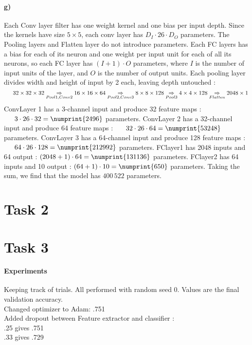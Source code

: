 \documentclass{article}
\begin{document}
		\paragraph{g)}
		Each Conv layer filter has one weight kernel and one bias per input depth. Since the kernels have size $5 \times 5$, each conv layer has $D_I \cdot 26 \cdot D_O$ parameters.\newline  
		The Pooling layers and Flatten layer do not introduce parameters. \newline
		Each FC layers has a bias for each of its neuron and one weight per input unit for each of all its neurons, so each FC layer has $ (I+1) \cdot O $ parameters, where $I$ is the number of input units of the layer, and $O$ is the number of output units. \newline
		Each pooling layer divides width and height of input by 2 each, leaving depth untouched :
		\[
			\indent 
			{32\times 32 \times 32}		\underset{Pool1, Conv2}{\Rightarrow}
		 	{16 \times 16 \times 64}	\underset{Pool2, Conv3}{\Rightarrow}
		    { 8 \times 8 \times 128}	\underset{Pool3}{\Rightarrow}
		    { 4 \times 4 \times 128}	\underset{Flatten}{\Rightarrow}
		    2048 \times 1
		 \]
		 ConvLayer 1 has a 3-channel input and produce 32 feature maps : \newline
		 $ \indent 3 \cdot 26 \cdot 32 = \numprint{2496}$ parameters. \newline
		 ConvLayer 2 has a 32-channel input and produce 64 feature maps : \newline
		 $ \indent 32 \cdot 26 \cdot 64 = \numprint{53248} $ parameters. \newline
		 ConvLayer 3 has a 64-channel input and produce 128 feature maps : \newline
		 $\indent 64 \cdot 26 \cdot 128 = \numprint{212992}$ parameters. \newline
		 FClayer1 has 2048 inputs and 64 output : 
		 $ (2048 + 1) \cdot 64 = \numprint{131136} $ parameters. \newline
		 FClayer2 has 64 inputs and 10 output : 
		 $ (64 + 1) \cdot 10 = \numprint{650}  $ parameters. \newline
		 Taking the sum, we find that the model has $400\,522$ parameters.
	\section*{Task 2}
	
	\section*{Task 3}
	
	\paragraph{Experiments} Keeping track of trials. All performed with random seed 0. Values are the final validation accuracy.\\
	\indent Changed optimizer to Adam: .751\\
	\indent Added dropout between Feature extractor and classifier :\\
	 \indent \indent .25 gives .751\\
	 \indent \indent  .33 gives .729
\end{document}
